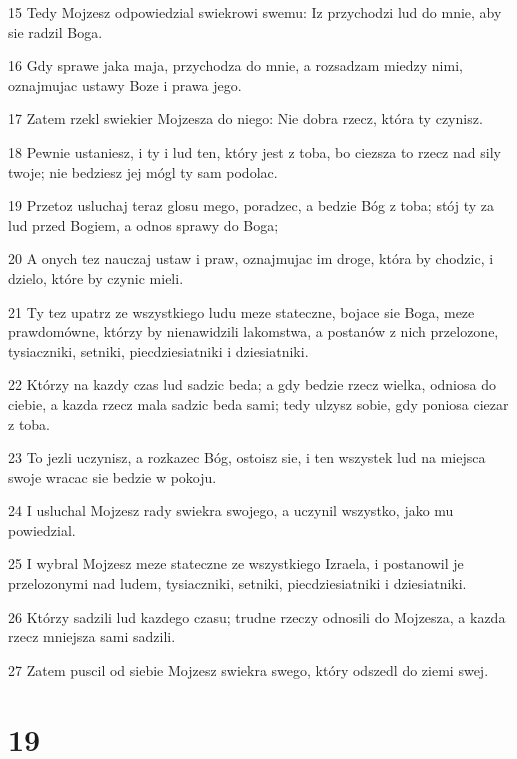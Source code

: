 \par 15 Tedy Mojzesz odpowiedzial swiekrowi swemu: Iz przychodzi lud do mnie, aby sie radzil Boga.
\par 16 Gdy sprawe jaka maja, przychodza do mnie, a rozsadzam miedzy nimi, oznajmujac ustawy Boze i prawa jego.
\par 17 Zatem rzekl swiekier Mojzesza do niego: Nie dobra rzecz, która ty czynisz.
\par 18 Pewnie ustaniesz, i ty i lud ten, który jest z toba, bo ciezsza to rzecz nad sily twoje; nie bedziesz jej mógl ty sam podolac.
\par 19 Przetoz usluchaj teraz glosu mego, poradzec, a bedzie Bóg z toba; stój ty za lud przed Bogiem, a odnos sprawy do Boga;
\par 20 A onych tez nauczaj ustaw i praw, oznajmujac im droge, która by chodzic, i dzielo, które by czynic mieli.
\par 21 Ty tez upatrz ze wszystkiego ludu meze stateczne, bojace sie Boga, meze prawdomówne, którzy by nienawidzili lakomstwa, a postanów z nich przelozone, tysiaczniki, setniki, piecdziesiatniki i dziesiatniki.
\par 22 Którzy na kazdy czas lud sadzic beda; a gdy bedzie rzecz wielka, odniosa do ciebie, a kazda rzecz mala sadzic beda sami; tedy ulzysz sobie, gdy poniosa ciezar z toba.
\par 23 To jezli uczynisz, a rozkazec Bóg, ostoisz sie, i ten wszystek lud na miejsca swoje wracac sie bedzie w pokoju.
\par 24 I usluchal Mojzesz rady swiekra swojego, a uczynil wszystko, jako mu powiedzial.
\par 25 I wybral Mojzesz meze stateczne ze wszystkiego Izraela, i postanowil je przelozonymi nad ludem, tysiaczniki, setniki, piecdziesiatniki i dziesiatniki.
\par 26 Którzy sadzili lud kazdego czasu; trudne rzeczy odnosili do Mojzesza, a kazda rzecz mniejsza sami sadzili.
\par 27 Zatem puscil od siebie Mojzesz swiekra swego, który odszedl do ziemi swej.

\chapter{19}

